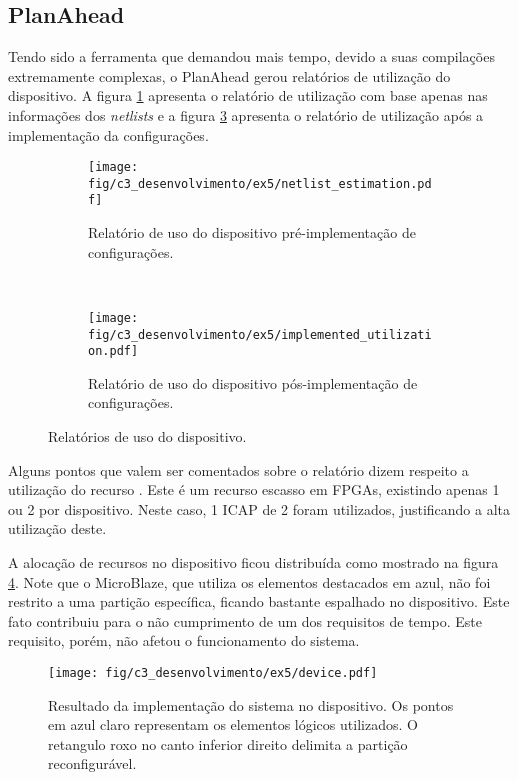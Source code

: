 \documentclass[11pt,a4paper,oneside]{book}
\begin{document}
\subsection{PlanAhead}
Tendo sido a ferramenta que demandou mais tempo, devido a suas compilações extremamente complexas, o PlanAhead gerou relatórios de utilização do dispositivo.
A figura \ref{fig:ex5:netlist} apresenta o relatório de utilização com base apenas nas informações dos \textit{netlists} e a figura \ref{fig:ex5:implemented} apresenta o relatório de utilização após a implementação da configurações.

\begin{figure}[htp]
        \centering
        \begin{subfigure}[b]{0.75\textwidth}
		\centering
		\texttt{[image: fig/c3\_desenvolvimento/ex5/netlist\_estimation.pdf]}
		\caption{Relatório de uso do dispositivo pré-implementação de configurações.}
		\label{fig:ex5:netlist}
        \end{subfigure} \\
        \begin{subfigure}[b]{0.75\textwidth}
        		\centering
		\texttt{[image: fig/c3\_desenvolvimento/ex5/implemented\_utilization.pdf]}
		\caption{Relatório de uso do dispositivo pós-implementação de configurações.}
		\label{fig:ex5:implemented}
        \end{subfigure}
        \caption{Relatórios de uso do dispositivo.}
\end{figure}

Alguns pontos que valem ser comentados sobre o relatório dizem respeito a utilização do recurso .
Este é um recurso escasso em FPGAs, existindo apenas 1 ou 2 por dispositivo.
Neste caso, 1 ICAP de 2 foram utilizados, justificando a alta utilização deste.
 
A alocação de recursos no dispositivo ficou distribuída como mostrado na figura \ref{fig:ex5:device}.
Note que o MicroBlaze, que utiliza os elementos destacados em azul, não foi restrito a uma partição específica, ficando bastante espalhado no dispositivo.
Este fato contribuiu para o não cumprimento de um dos requisitos de tempo.
Este requisito, porém, não afetou o funcionamento do sistema.

\begin{figure}[htp]
\centering
\texttt{[image: fig/c3\_desenvolvimento/ex5/device.pdf]}
\caption{Resultado da implementação do sistema no dispositivo. Os pontos em azul claro representam os elementos lógicos utilizados. O retangulo roxo no canto inferior direito delimita a partição reconfigurável.}
\label{fig:ex5:device}
\end{figure}
\end{document}

